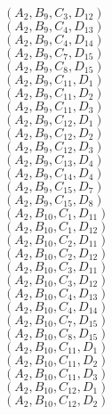 \documentclass[14pt]{article}
\begin{document}
    $({A}_{2}, {B}_{9}, {C}_{3}, {D}_{12}) $ \\ 
    $({A}_{2}, {B}_{9}, {C}_{4}, {D}_{13}) $ \\ 
    $({A}_{2}, {B}_{9}, {C}_{4}, {D}_{14}) $ \\ 
    $({A}_{2}, {B}_{9}, {C}_{7}, {D}_{15}) $ \\ 
    $({A}_{2}, {B}_{9}, {C}_{8}, {D}_{15}) $ \\ 
    $({A}_{2}, {B}_{9}, {C}_{11}, {D}_{1}) $ \\ 
    $({A}_{2}, {B}_{9}, {C}_{11}, {D}_{2}) $ \\ 
    $({A}_{2}, {B}_{9}, {C}_{11}, {D}_{3}) $ \\ 
    $({A}_{2}, {B}_{9}, {C}_{12}, {D}_{1}) $ \\ 
    $({A}_{2}, {B}_{9}, {C}_{12}, {D}_{2}) $ \\ 
    $({A}_{2}, {B}_{9}, {C}_{12}, {D}_{3}) $ \\ 
    $({A}_{2}, {B}_{9}, {C}_{13}, {D}_{4}) $ \\ 
    $({A}_{2}, {B}_{9}, {C}_{14}, {D}_{4}) $ \\ 
    $({A}_{2}, {B}_{9}, {C}_{15}, {D}_{7}) $ \\ 
    $({A}_{2}, {B}_{9}, {C}_{15}, {D}_{8}) $ \\ 
    $({A}_{2}, {B}_{10}, {C}_{1}, {D}_{11}) $ \\ 
    $({A}_{2}, {B}_{10}, {C}_{1}, {D}_{12}) $ \\ 
    $({A}_{2}, {B}_{10}, {C}_{2}, {D}_{11}) $ \\ 
    $({A}_{2}, {B}_{10}, {C}_{2}, {D}_{12}) $ \\ 
    $({A}_{2}, {B}_{10}, {C}_{3}, {D}_{11}) $ \\ 
    $({A}_{2}, {B}_{10}, {C}_{3}, {D}_{12}) $ \\ 
    $({A}_{2}, {B}_{10}, {C}_{4}, {D}_{13}) $ \\ 
    $({A}_{2}, {B}_{10}, {C}_{4}, {D}_{14}) $ \\ 
    $({A}_{2}, {B}_{10}, {C}_{7}, {D}_{15}) $ \\ 
    $({A}_{2}, {B}_{10}, {C}_{8}, {D}_{15}) $ \\ 
    $({A}_{2}, {B}_{10}, {C}_{11}, {D}_{1}) $ \\ 
    $({A}_{2}, {B}_{10}, {C}_{11}, {D}_{2}) $ \\ 
    $({A}_{2}, {B}_{10}, {C}_{11}, {D}_{3}) $ \\ 
    $({A}_{2}, {B}_{10}, {C}_{12}, {D}_{1}) $ \\ 
    $({A}_{2}, {B}_{10}, {C}_{12}, {D}_{2}) $ \\ 
\end{document}
